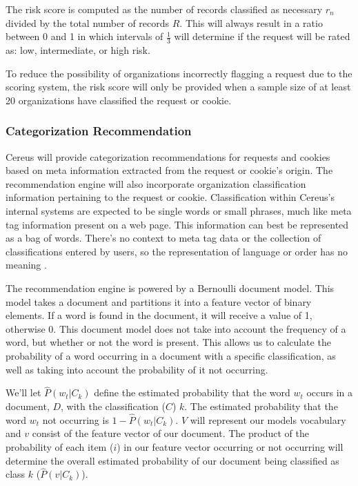 The risk score is computed as the number of records classified as necessary \( r_n \) divided by the total number of records \( R \). This will always result in a ratio between 0 and 1 in which intervals of \(\frac{1}{3}\) will determine if the request will be rated as: low, intermediate, or high risk.

To reduce the possibility of organizations incorrectly flagging a request due to the scoring system, the risk score will only be provided when a sample size of at least 20 organizations have classified the request or cookie.

\subsubsection*{Categorization Recommendation}

Cereus will provide categorization recommendations for requests and cookies based on meta information extracted from the request or cookie's origin. The recommendation engine will also incorporate organization classification information pertaining to the request or cookie. Classification within Cereus's internal systems are expected to be single words or small phrases, much like meta tag information present on a web page. This information can best be represented as a bag of words. There's no context to meta tag data or the collection of classifications entered by users, so the representation of language or order has no meaning \cite{manning.2008}.

The recommendation engine is powered by a Bernoulli document model. This model takes a document and partitions it into a feature vector of binary elements. If a word is found in the document, it will receive a value of 1, otherwise 0. This document model does not take into account the frequency of a word, but whether or not the word is present. This allows us to calculate the probability of a word occurring in a document with a specific classification, as well as taking into account the probability of it not occurring.

We'll let \(\hat{P}(w_{t}|C_{k})\) define the estimated probability that the word \(w_{t}\) occurs in a document, \(D\), with the classification (\(C\)) \(k\). The estimated probability that the word \(w_{t}\) not occurring is \(1 - \hat{P}(w_{t}|C_{k})\). \(V\) will represent our models vocabulary and \(v\) consist of the feature vector of our document. The product of the probability of each item (\(i\)) in our feature vector occurring or not occurring will determine the overall estimated probability of our document being classified as class \(k\) (\(\hat{P}(v|C_{k})\)).

